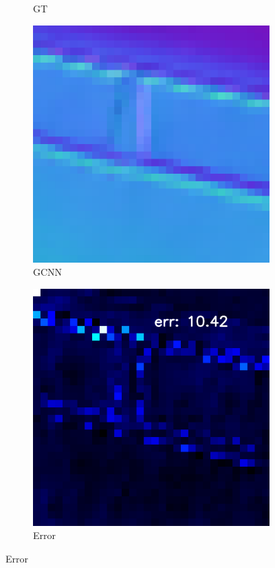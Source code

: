 \begin{figure}
\begin{subfigure}[b]{0.24\linewidth}
		\caption{GT}
	\end{subfigure}
	\begin{subfigure}[b]{0.24\linewidth}
		\includegraphics[width=\linewidth]{./Figures/gcnn_synthetic/eval_9_normal_GCNN-GCNN.png}
		\caption{GCNN}
	\end{subfigure}
	\begin{subfigure}[b]{0.24\linewidth}
		\includegraphics[width=\linewidth]{./Figures/gcnn_synthetic/eval_9_error_GCNN-CNN.png}
		\caption{Error}
	\end{subfigure}
	

\end{figure}
